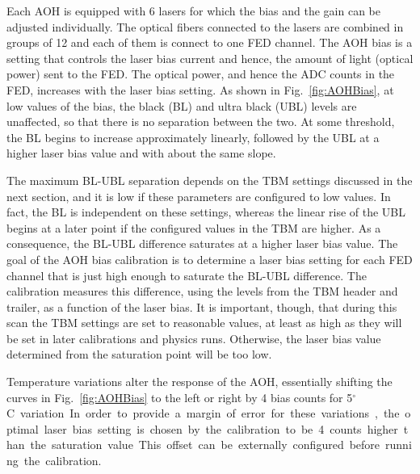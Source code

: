 Each AOH is equipped with 6 lasers for which the bias and the gain can be adjusted individually. The optical fibers connected to the lasers are combined in groups of 12 and each of them is connect to one FED channel.
The AOH bias is a setting that controls the laser bias current and hence, the amount of light (optical power) sent to the FED.
The optical power, and hence the ADC counts in the FED, increases with the laser bias setting.
As shown in Fig.~\ref{fig:AOHBias}, at low values of the bias, the black (BL) and ultra black (UBL) levels are unaffected, so that there is no separation between the two.
At some threshold, the BL begins to increase approximately linearly, followed by the UBL at a higher laser bias value and with about the same slope.

The maximum BL-UBL separation depends on the TBM settings discussed in the next section, and it is low if these parameters are configured to low values.
In fact, the BL is independent on these settings, whereas the linear rise of the UBL begins at a later point if the configured values in the TBM are higher.
As a consequence, the BL-UBL difference saturates at a higher laser bias value.
The goal of the AOH bias calibration is to determine a laser bias setting for each FED channel that is just high enough to saturate the BL-UBL difference.
The calibration measures this difference, using the levels from the TBM header and trailer, as a function of the laser bias.
It is important, though, that during this scan the TBM settings are set to reasonable values, at least as high as they will be set in later calibrations and physics runs.
Otherwise, the laser bias value determined from the saturation point will be too low.

Temperature variations alter the response of the AOH, essentially shifting the curves in Fig.~\ref{fig:AOHBias} to the left or right by 4 bias counts for 5\unit{$^\circ$C} variation.
In order to provide a margin of error for these variations, the optimal laser bias setting is chosen by the calibration to be 4 counts higher than the saturation value.
This offset can be externally configured before running the calibration.

